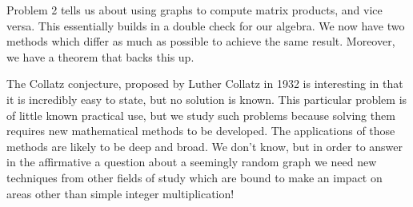 \documentclass[16 pt]{amsart}
\theoremstyle{definition}
\theoremstyle{remark}
\numberwithin{equation}{subsection}
\begin{document}
\par Problem 2 tells us about using graphs to compute matrix products, and vice versa.  This essentially builds in a double check for our algebra.  We now have two methods which differ as much as possible to achieve the same result. Moreover, we have a theorem that backs this up.\\

\par The Collatz conjecture, proposed by Luther Collatz in 1932 is interesting in that it is incredibly easy to state, but no solution is known.  This particular problem is of little known practical use, but we study such problems because solving them requires new mathematical methods to be developed.  The applications of those methods are likely to be deep and broad.  We don't know, but in order to answer in the affirmative a question about a seemingly random graph we need new techniques from other fields of study which are bound to make an impact on areas other than simple integer multiplication!
\end{document}
